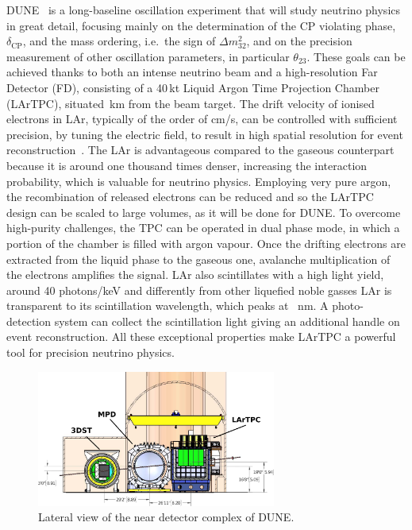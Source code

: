 DUNE~\cite{Abi:2018dnh} is a long-baseline oscillation experiment that %
will study neutrino physics in great detail, focusing mainly on the determination %
of the CP violating phase, $\delta_\text{CP}$, and the mass ordering, i.e.\ the sign of $\Delta m_{32}^2$, %
and on the precision measurement of other oscillation parameters, in particular $\theta_{23}$.
These goals can be achieved thanks to both an intense neutrino beam and a high-resolution Far Detector (FD), %
consisting of a 40\,kt Liquid Argon Time Projection Chamber (LArTPC), situated \,km from the beam target.
The drift velocity of ionised electrons in LAr, typically of the order of cm/\textmu s, %
can be controlled with sufficient precision, by tuning the electric field, %
to result in high spatial resolution for event reconstruction~\cite{Rubbia:1977zz}.
The LAr is advantageous compared to the gaseous counterpart because it is around one thousand times denser, %
increasing the interaction probability, which is valuable for neutrino physics.
Employing very pure argon, the recombination of released electrons can be reduced and %
so the LArTPC design can be scaled to large volumes, as it will be done for DUNE.
To overcome high-purity challenges, the TPC can be operated in dual phase mode, in which a portion of the chamber is filled %
with argon vapour.
Once the drifting electrons are extracted from the liquid phase to the gaseous one, %
avalanche multiplication of the electrons amplifies the signal.
LAr also scintillates with a high light yield, around 40 photons/keV and differently from other %
liquefied noble gasses LAr is transparent to its scintillation wavelength, which peaks at ~nm.
A photo-detection system can collect the scintillation light giving an additional handle on event reconstruction.
All these exceptional properties make LArTPC a powerful tool for precision neutrino physics.

\begin{figure}
	\centering
	\includegraphics[width=0.7\textwidth]{pics/duneND.png}
	\caption[View of the near detector complex of DUNE]%
	{Lateral view of the near detector complex of DUNE.}
	\label{fig:duneND}
\end{figure}

